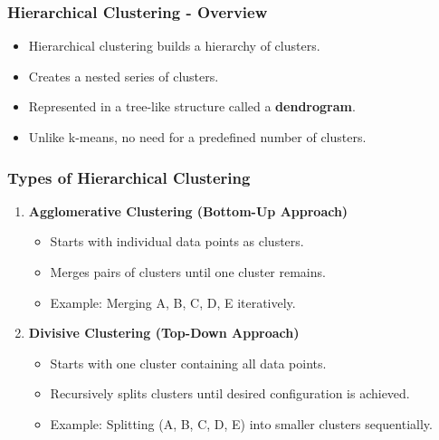 \documentclass[aspectratio=169]{beamer}
\begin{document}
\begin{frame}[fragile]
    \frametitle{Hierarchical Clustering - Overview}
    \begin{itemize}
        \item Hierarchical clustering builds a hierarchy of clusters.
        \item Creates a nested series of clusters.
        \item Represented in a tree-like structure called a \textbf{dendrogram}.
        \item Unlike k-means, no need for a predefined number of clusters.
    \end{itemize}
\end{frame}

\begin{frame}[fragile]
    \frametitle{Types of Hierarchical Clustering}
    \begin{enumerate}
        \item \textbf{Agglomerative Clustering (Bottom-Up Approach)}
        \begin{itemize}
            \item Starts with individual data points as clusters.
            \item Merges pairs of clusters until one cluster remains.
            \item Example: Merging A, B, C, D, E iteratively.
        \end{itemize}
        
        \item \textbf{Divisive Clustering (Top-Down Approach)}
        \begin{itemize}
            \item Starts with one cluster containing all data points.
            \item Recursively splits clusters until desired configuration is achieved.
            \item Example: Splitting (A, B, C, D, E) into smaller clusters sequentially.
        \end{itemize}
    \end{enumerate}
\end{frame}
\end{document}

